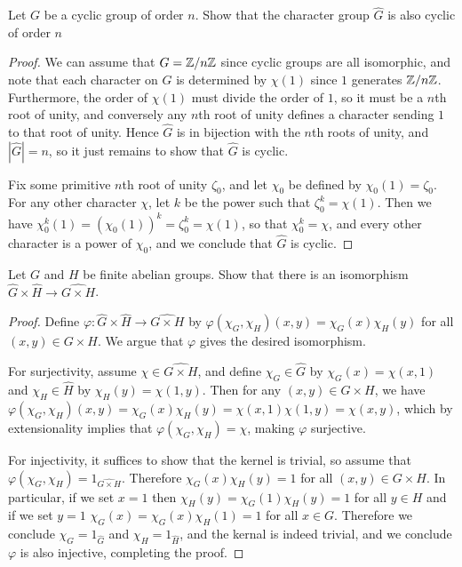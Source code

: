 \documentclass[11pt]{article}
\begin{document}
Let $G$ be a cyclic group of order $n$. Show that the character group $\hat G$ is also cyclic of order $n$
\begin{proof}
  We can assume that $G = \mathbb{Z}/n\mathbb{Z}$ since cyclic groups are all isomorphic, and note that each character on $G$ is determined by $\chi(1)$ since $1$ generates $\mathbb{Z}/n\mathbb{Z}$.
  Furthermore, the order of $\chi(1)$ must divide the order of $1$, so it must be a $n$th root of unity, and conversely any $n$th root of unity defines a character sending $1$ to that root of unity.
  Hence $\hat{G}$ is in bijection with the $n$th roots of unity, and $|\hat{G}| = n$, so it just remains to show that $\hat{G}$ is cyclic.

  Fix some primitive $n$th root of unity $\zeta_0$, and let $\chi_0$ be defined by $\chi_0(1) = \zeta_0$.
  For any other character $\chi$, let $k$ be the power such that $\zeta_0^k = \chi(1)$.
  Then we have $\chi_0^k(1) = (\chi_0(1))^k = \zeta_0^k = \chi(1)$, so that $\chi_0^k = \chi$, and every other character is a power of $\chi_0$, and we conclude that $\hat{G}$ is cyclic.
\end{proof}

Let $G$ and $H$ be finite abelian groups. Show that there is an isomorphism $\hat{G} \times \hat{H} \rightarrow \widehat{G \times H}$.
\begin{proof}
  Define $\varphi : \hat{G} \times \hat{H} \rightarrow \widehat{G \times H}$ by $\varphi(\chi_G, \chi_H)(x, y) = \chi_G(x)\chi_H(y)$ for all $(x,y) \in G \times H$.
  We argue that $\varphi$ gives the desired isomorphism.

  For surjectivity, assume $\chi \in \widehat{G \times H}$, and define $\chi_G \in \hat G$ by $\chi_G(x) = \chi(x, 1)$ and $\chi_H \in \hat H$ by $\chi_H(y) = \chi(1, y)$.
  Then for any $(x,y) \in G \times H$, we have $\varphi(\chi_G, \chi_H)(x, y) = \chi_G(x)\chi_H(y) = \chi(x,1)\chi(1,y) = \chi(x,y)$, which by extensionality implies that $\varphi(\chi_G, \chi_H) = \chi$, making $\varphi$ surjective.

  For injectivity, it suffices to show that the kernel is trivial, so assume that $\varphi(\chi_G, \chi_H) = 1_{\widehat{G \times H}}$.
  Therefore $\chi_G(x)\chi_H(y) = 1$ for all $(x,y) \in G \times H$.
  In particular, if we set $x = 1$ then $\chi_H(y) = \chi_G(1)\chi_H(y) = 1$ for all $y \in H$ and if we set $y = 1$ $\chi_G(x) = \chi_G(x)\chi_H(1) = 1$ for all $x \in G$.
  Therefore we conclude $\chi_G = 1_{\hat G}$ and $\chi_H = 1_{\hat H}$, and the kernal is indeed trivial, and we conclude $\varphi$ is also injective, completing the proof.
\end{proof}
\end{document}
